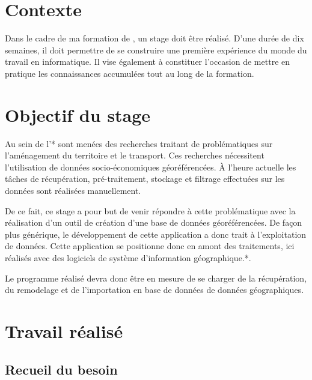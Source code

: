 

\section*{Contexte}

Dans le cadre de ma formation de \dut, un stage doit être réalisé. D'une durée de dix semaines, il doit permettre de se construire une première expérience du monde du travail en informatique. Il vise également à constituer l'occasion de mettre en pratique les connaissances accumulées tout au long de la formation.

\section*{Objectif du stage}

Au sein de l'* sont menées des recherches traitant de problématiques sur l'aménagement du territoire et le transport. Ces recherches nécessitent l'utilisation de données socio-économiques géoréférencées. À l'heure actuelle les tâches de récupération, pré-traitement, stockage et filtrage effectuées sur les données sont réalisées manuellement.

De ce fait, ce stage a pour but de venir répondre à cette problématique avec la réalisation d'un outil de création d'une base de données géoréférencées. De façon plus générique, le développement de cette application a donc trait à l'exploitation de données. Cette application se positionne donc en amont des traitements, ici réalisés avec des logiciels de système d'information géographique.*.

Le programme réalisé devra donc être en mesure de se charger de la récupération, du remodelage et de l'importation en base de données de données géographiques.

\section*{Travail réalisé}

  \subsection*{Recueil du besoin}

